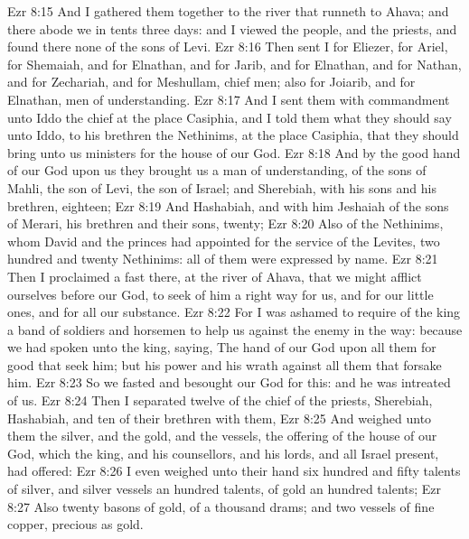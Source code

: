 \vs Ezr 8:15 And I gathered them together to the river that runneth to Ahava; and there abode we in tents three days: and I viewed the people, and the priests, and found there none of the sons of Levi.
\vs Ezr 8:16 Then sent I for Eliezer, for Ariel, for Shemaiah, and for Elnathan, and for Jarib, and for Elnathan, and for Nathan, and for Zechariah, and for Meshullam, chief men; also for Joiarib, and for Elnathan, men of understanding.
\vs Ezr 8:17 And I sent them with commandment unto Iddo the chief at the place Casiphia, and I told them what they should say unto Iddo,  to his brethren the Nethinims, at the place Casiphia, that they should bring unto us ministers for the house of our God.
\vs Ezr 8:18 And by the good hand of our God upon us they brought us a man of understanding, of the sons of Mahli, the son of Levi, the son of Israel; and Sherebiah, with his sons and his brethren, eighteen;
\vs Ezr 8:19 And Hashabiah, and with him Jeshaiah of the sons of Merari, his brethren and their sons, twenty;
\vs Ezr 8:20 Also of the Nethinims, whom David and the princes had appointed for the service of the Levites, two hundred and twenty Nethinims: all of them were expressed by name.
\vs Ezr 8:21 Then I proclaimed a fast there, at the river of Ahava, that we might afflict ourselves before our God, to seek of him a right way for us, and for our little ones, and for all our substance.
\vs Ezr 8:22 For I was ashamed to require of the king a band of soldiers and horsemen to help us against the enemy in the way: because we had spoken unto the king, saying, The hand of our God  upon all them for good that seek him; but his power and his wrath  against all them that forsake him.
\vs Ezr 8:23 So we fasted and besought our God for this: and he was intreated of us.
\vs Ezr 8:24 Then I separated twelve of the chief of the priests, Sherebiah, Hashabiah, and ten of their brethren with them,
\vs Ezr 8:25 And weighed unto them the silver, and the gold, and the vessels,  the offering of the house of our God, which the king, and his counsellors, and his lords, and all Israel  present, had offered:
\vs Ezr 8:26 I even weighed unto their hand six hundred and fifty talents of silver, and silver vessels an hundred talents,  of gold an hundred talents;
\vs Ezr 8:27 Also twenty basons of gold, of a thousand drams; and two vessels of fine copper, precious as gold.
